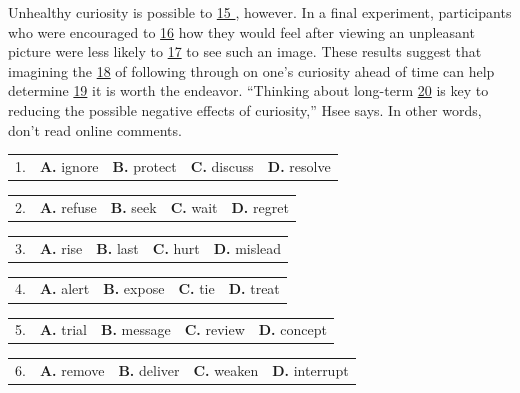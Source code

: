 \documentclass[UTF8,11pt]{ctexart}
\begin{document}
Unhealthy curiosity is possible to \uline{15 }, however. In a final experiment, participants who were encouraged to \uline{16} how they would feel after viewing an unpleasant picture were less likely to \uline{17} to see such an image. These results suggest that imagining the \uline{18} of following through on one’s curiosity ahead of time can help determine \uline{19} it is worth the endeavor. “Thinking about long-term \uline{20} is key to reducing the possible negative effects of curiosity,” Hsee says. In other words, don’t read online comments.


\noindent\begin{tabularx}{\linewidth}{@{}lXXXX@{}}1. & \textbf{A.} ignore & \textbf{B.} protect & \textbf{C.} discuss & \textbf{D.} resolve\\\end{tabularx}\par

\noindent\begin{tabularx}{\linewidth}{@{}lXXXX@{}}2. & \textbf{A.} refuse & \textbf{B.} seek & \textbf{C.} wait & \textbf{D.} regret\\\end{tabularx}\par

\noindent\begin{tabularx}{\linewidth}{@{}lXXXX@{}}3. & \textbf{A.} rise & \textbf{B.} last & \textbf{C.} hurt & \textbf{D.} mislead\\\end{tabularx}\par

\noindent\begin{tabularx}{\linewidth}{@{}lXXXX@{}}4. & \textbf{A.} alert & \textbf{B.} expose & \textbf{C.} tie & \textbf{D.} treat\\\end{tabularx}\par

\noindent\begin{tabularx}{\linewidth}{@{}lXXXX@{}}5. & \textbf{A.} trial & \textbf{B.} message & \textbf{C.} review & \textbf{D.} concept\\\end{tabularx}\par

\noindent\begin{tabularx}{\linewidth}{@{}lXXXX@{}}6. & \textbf{A.} remove & \textbf{B.} deliver & \textbf{C.} weaken & \textbf{D.} interrupt\\\end{tabularx}\par
\end{document}
